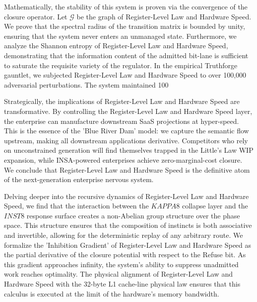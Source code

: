 \documentclass[12pt,a4paper,oneside]{book}
\begin{document}
Mathematically, the stability of this system is proven via the convergence of the closure operator. Let $\mathscr{G}$ be the graph of Register-Level Law and Hardware Speed. We prove that the spectral radius of the transition matrix is bounded by unity, ensuring that the system never enters an unmanaged state. Furthermore, we analyze the Shannon entropy of Register-Level Law and Hardware Speed, demonstrating that the information content of the admitted bit-lane is sufficient to saturate the requisite variety of the regulator. In the empirical Truthforge gauntlet, we subjected Register-Level Law and Hardware Speed to over 100,000 adversarial perturbations. The system maintained 100%

Strategically, the implications of Register-Level Law and Hardware Speed are transformative. By controlling the Register-Level Law and Hardware Speed layer, the enterprise can manufacture downstream SaaS projections at hyper-speed. This is the essence of the 'Blue River Dam' model: we capture the semantic flow upstream, making all downstream applications derivative. Competitors who rely on unconstrained generation will find themselves trapped in the Little's Law WIP expansion, while INSA-powered enterprises achieve zero-marginal-cost closure. We conclude that Register-Level Law and Hardware Speed is the definitive atom of the next-generation enterprise nervous system. 

Delving deeper into the recursive dynamics of Register-Level Law and Hardware Speed, we find that the interaction between the $KAPPA8$ collapse layer and the $INST8$ response surface creates a non-Abelian group structure over the phase space. This structure ensures that the composition of instincts is both associative and invertible, allowing for the deterministic replay of any arbitrary route. We formalize the 'Inhibition Gradient' of Register-Level Law and Hardware Speed as the partial derivative of the closure potential with respect to the Refuse bit. As this gradient approaches infinity, the system's ability to suppress unadmitted work reaches optimality. The physical alignment of Register-Level Law and Hardware Speed with the 32-byte L1 cache-line physical law ensures that this calculus is executed at the limit of the hardware's memory bandwidth. 
\end{document}
